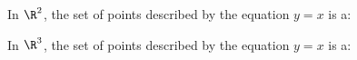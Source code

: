 \documentclass{ximera}
\author{Bart Snapp}
\begin{document}
\begin{exercise}
  In $\R^2$, the set of points described by the equation
  $y=x$ is a:
  \begin{multipleChoice}
  \end{multipleChoice}
  \begin{exercise}
  In $\R^3$, the set of points described by the equation $y=x$ is a:
  \begin{multipleChoice}
  \end{multipleChoice}
\end{exercise}
\end{exercise}
\end{document}
